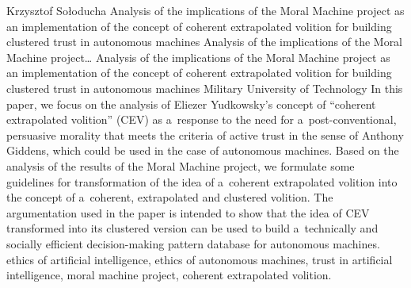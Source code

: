 \begin{artengenv}{Krzysztof Sołoducha}
	{Analysis of the implications of the Moral Machine project as an implementation of the concept of coherent extrapolated volition for building clustered trust in autonomous machines}
	{Analysis of the implications of the Moral Machine project\ldots}
	{Analysis of the implications of the Moral Machine project as an implementation of the concept of coherent extrapolated volition for building clustered trust in autonomous machines}
	{Military University of Technology}
	{In this paper, we focus on the analysis of Eliezer Yudkowsky's concept of ``coherent extrapolated volition'' (CEV) as a~response to the need for a~post-conventional, persuasive morality that meets the criteria of active trust in the sense of Anthony Giddens, which could be used in the case of autonomous machines. Based on the analysis of the results of the Moral Machine project, we formulate some guidelines for transformation of the idea of a~coherent extrapolated volition into the concept of a~coherent, extrapolated and clustered volition. The argumentation used in the paper is intended to show that the idea of CEV transformed into its clustered version can be used to build a~technically and socially efficient decision-making pattern database for autonomous machines.
	}
	{ethics of artificial intelligence, ethics of autonomous machines, trust in artificial intelligence, moral machine project, coherent extrapolated volition.}
	

\end{artengenv}
